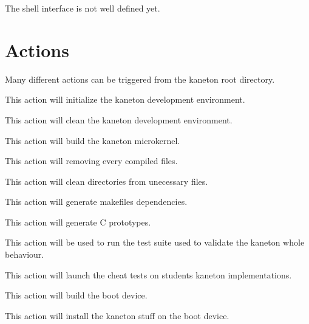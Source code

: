 The shell interface is not well defined yet.

%
%

\section{Actions}

Many different actions can be triggered from the kaneton root directory.

        {
	  This action will initialize the kaneton development environment.

	}

	{
	  This action will clean the kaneton development environment.

	}

	{
	  This action will build the kaneton microkernel.

	}

	{
	  This action will removing every compiled files.

	}

	{
	  This action will clean directories from unecessary files.

	}

	{
	  This action will generate makefiles dependencies.

	}

	{
	  This action will generate C prototypes.

	}

	{
	  This action will be used to run the test suite used to validate
	  the kaneton whole behaviour.

	}

	{
	  This action will launch the cheat tests on students kaneton
	  implementations.


	}

	{
	  This action will build the boot device.

	}

	{
	  This action will install the kaneton stuff on the boot device.

	}


